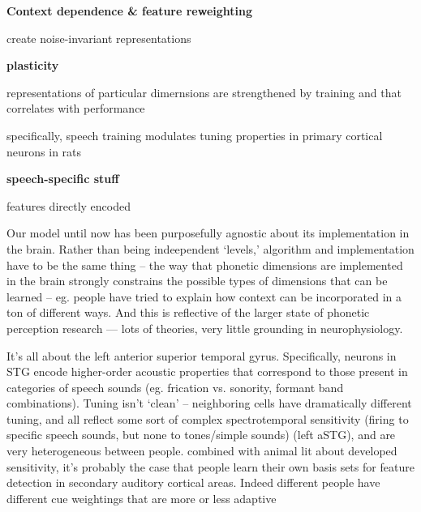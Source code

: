 \textbf{Context dependence \& feature reweighting}

create noise-invariant representations \cite{rabinowitzConstructingNoiseinvariantRepresentations2013}


\textbf{plasticity}

representations of particular dimernsions are strengthened by training\cite{irvinePlasticityAuditorySystem2018} and that correlates with performance\cite{bieszczadRepresentationalGainCortical2010}

specifically, speech training modulates tuning properties in primary cortical neurons in rats \cite{engineerSpeechTrainingAlters2015a}


\textbf{speech-specific stuff}

features directly encoded\cite{changCategoricalSpeechRepresentation2010b,mesgaraniPhoneticFeatureEncoding2014,belinVoiceselectiveAreasHuman2000b,Pasley2012}



Our model until now has been purposefully agnostic about its implementation in the brain. Rather than being indeependent `levels,' algorithm and implementation have to be the same thing -- the way that phonetic dimensions are implemented in the brain strongly constrains the possible types of dimensions that can be learned -- eg. people have tried to explain how context can be incorporated in a ton of different ways. And this is reflective of the larger state of phonetic perception research --- lots of theories, very little grounding in neurophysiology.

It's all about the left anterior superior temporal gyrus\cite{yiEncodingSpeechSounds2019}. Specifically, neurons in STG encode higher-order acoustic properties that correspond to those present in categories of speech sounds (eg. frication vs. sonority, formant band combinations). Tuning isn't `clean' -- neighboring cells have dramatically different tuning, and all reflect some sort of complex spectrotemporal sensitivity (firing to specific speech sounds, but none to tones/simple sounds) (left aSTG)\cite{chanSpeechSpecificTuningNeurons2014}, and are very heterogeneous between people. combined with animal lit about developed sensitivity, it's probably the case that people learn their own basis sets for feature detection in secondary auditory cortical areas. Indeed different people have different cue weightings that are more or less adaptive\cite{clayardsDifferencesCueWeights2018}

